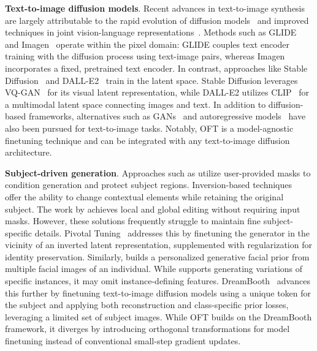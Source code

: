 \textbf{Text-to-image diffusion models}. Recent advances in text-to-image synthesis~\cite{saharia2022photorealistic,ramesh2022hierarchical,rombach2022high,gu2022vector,nichol2022glide} are largely attributable to the rapid evolution of diffusion models~\cite{ho2020denoising,song2021score,song2021denoising,dhariwal2021diffusion} and improved techniques in joint vision-language representations~\cite{su2020vlbert,lu2019vilbert,radford2021learning,wang2021simvlm,li2022blip,li2023blip,alayrac2022flamingo,schuhmann2022laion}. Methods such as GLIDE~\cite{nichol2022glide} and Imagen~\cite{saharia2022photorealistic} operate within the pixel domain: GLIDE couples text encoder training with the diffusion process using text-image pairs, whereas Imagen incorporates a fixed, pretrained text encoder. In contrast, approaches like Stable Diffusion~\cite{rombach2022high} and DALL-E2~\cite{ramesh2022hierarchical} train in the latent space. Stable Diffusion leverages VQ-GAN~\cite{esser2021taming} for its visual latent representation, while DALL-E2 utilizes CLIP~\cite{radford2021learning} for a multimodal latent space connecting images and text. In addition to diffusion-based frameworks, alternatives such as GANs~\cite{reed2016generative,zhang2017stackgan,xu2018attngan,li2019controllable} and autoregressive models~\cite{ramesh2021zero,ding2021cogview,wu2022nuwa,yuscaling} have also been pursued for text-to-image tasks. Notably, OFT is a model-agnostic finetuning technique and can be integrated with any text-to-image diffusion architecture.

\textbf{Subject-driven generation}. Approaches such as \cite{avrahami2022blended,nichol2022glide} utilize user-provided masks to condition generation and protect subject regions. Inversion-based techniques~\cite{choi2021ilvr,dhariwal2021diffusion,ramesh2022hierarchical,gal2022image} offer the ability to change contextual elements while retaining the original subject. The work by \cite{hertz2022prompt} achieves local and global editing without requiring input masks. However, these solutions frequently struggle to maintain fine subject-specific details. Pivotal Tuning~\cite{roich2022pivotal} addresses this by finetuning the generator in the vicinity of an inverted latent representation, supplemented with regularization for identity preservation. Similarly, \cite{nitzan2022mystyle} builds a personalized generative facial prior from multiple facial images of an individual. While \cite{casanova2021instance} supports generating variations of specific instances, it may omit instance-defining features. DreamBooth~\cite{ruiz2023dreambooth} advances this further by finetuning text-to-image diffusion models using a unique token for the subject and applying both reconstruction and class-specific prior losses, leveraging a limited set of subject images. While OFT builds on the DreamBooth framework, it diverges by introducing orthogonal transformations for model finetuning instead of conventional small-step gradient updates.

